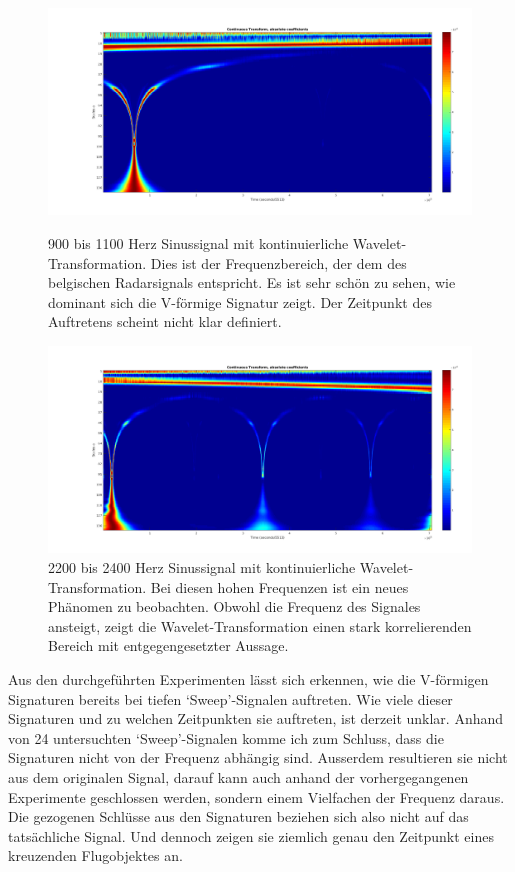 \begin{refsection}
\begin{figure}
	\centering
	\includegraphics[width=0.9\linewidth]{papers/meteor/images/anomalie/sweep/cwt_0900to1100hz.png}
	\caption{900 bis 1100 Herz Sinussignal mit kontinuierliche Wavelet-Transformation.
	Dies ist der Frequenzbereich, der dem des belgischen Radarsignals entspricht.
	Es ist sehr schön zu sehen, wie dominant sich die V-förmige Signatur zeigt.
	Der Zeitpunkt des Auftretens scheint nicht klar definiert.}
	\includegraphics[width=0.9\linewidth]{papers/meteor/images/anomalie/sweep/cwt_2200to2400hz.png}
	\caption{2200 bis 2400 Herz Sinussignal mit kontinuierliche Wavelet-Transformation.
	Bei diesen hohen Frequenzen ist ein neues Phänomen zu beobachten.
	Obwohl die Frequenz des Signales ansteigt, zeigt die Wavelet-Transformation einen stark korrelierenden Bereich mit entgegengesetzter Aussage.}
	\label{fig:cwt_anomalie_beam_2}
\end{figure}
Aus den durchgeführten Experimenten lässt sich erkennen, wie die V-förmigen Signaturen bereits bei tiefen `Sweep'-Signalen auftreten.
Wie viele dieser Signaturen und zu welchen Zeitpunkten sie auftreten, ist derzeit unklar.
Anhand von 24 untersuchten `Sweep'-Signalen komme ich zum Schluss, dass die Signaturen nicht von der Frequenz abhängig sind.
Ausserdem resultieren sie nicht aus dem originalen Signal, darauf kann auch anhand der vorhergegangenen Experimente geschlossen werden, sondern einem Vielfachen der Frequenz daraus. 
Die gezogenen Schlüsse aus den Signaturen beziehen sich also nicht auf das tatsächliche Signal.
Und dennoch zeigen sie ziemlich genau den Zeitpunkt eines kreuzenden Flugobjektes an.


\end{refsection}
